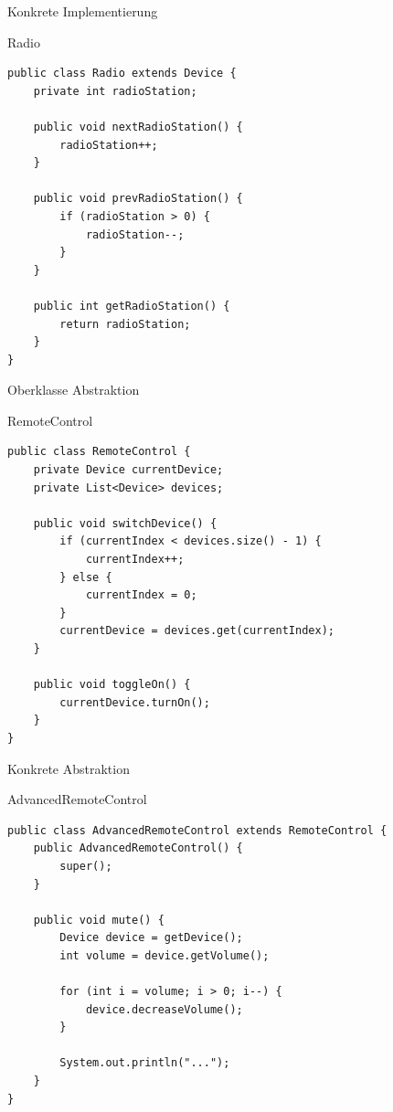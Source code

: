 \begin{frame}[fragile]{Konkrete Implementierung}
	\begin{exampleblock}{Radio}
 		\begin{lstlisting}
public class Radio extends Device {
	private int radioStation;
	
	public void nextRadioStation() {
		radioStation++;
	}
	
	public void prevRadioStation() {
		if (radioStation > 0) {
			radioStation--;
		}
	}
	
	public int getRadioStation() {
		return radioStation;
	}
}
 		\end{lstlisting}
 	\end{exampleblock}
\end{frame}

\begin{frame}[fragile]{Oberklasse Abstraktion}
	\begin{exampleblock}{RemoteControl}
 		\begin{lstlisting}
public class RemoteControl {
	private Device currentDevice;
	private List<Device> devices;

	public void switchDevice() {
		if (currentIndex < devices.size() - 1) {
			currentIndex++;
		} else {
			currentIndex = 0;
		}
		currentDevice = devices.get(currentIndex);
	}
	
	public void toggleOn() {
		currentDevice.turnOn();
	}
}
 		\end{lstlisting}
 	\end{exampleblock}
\end{frame}

\begin{frame}[fragile]{Konkrete Abstraktion}
	\begin{exampleblock}{AdvancedRemoteControl}
 		\begin{lstlisting}
public class AdvancedRemoteControl extends RemoteControl {
	public AdvancedRemoteControl() {
		super();
	}
	
	public void mute() {
		Device device = getDevice(); 
		int volume = device.getVolume();
		
		for (int i = volume; i > 0; i--) {
			device.decreaseVolume();
		}
		
		System.out.println("...");
	}
}

 		\end{lstlisting}
 	\end{exampleblock}
\end{frame}

